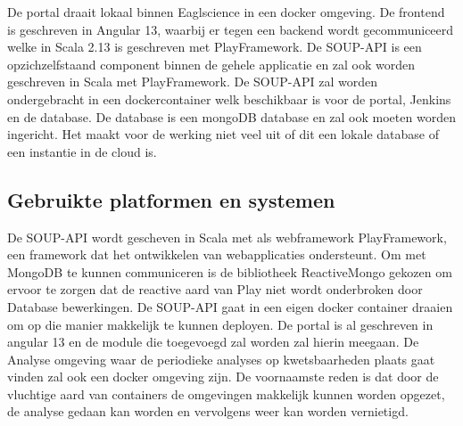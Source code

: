 De portal draait lokaal binnen Eaglscience in een docker omgeving. De frontend is geschreven in Angular 13, waarbij er tegen een backend wordt gecommuniceerd welke in Scala 2.13 is geschreven met PlayFramework. De SOUP-API is een opzichzelfstaand component binnen de gehele applicatie en zal ook worden geschreven in Scala met PlayFramework. De SOUP-API zal worden ondergebracht in een dockercontainer welk beschikbaar is voor de portal, Jenkins en de database. De database is een mongoDB database en zal ook moeten worden ingericht. Het maakt voor de werking niet veel uit of dit een lokale database of een instantie in de cloud is.

\subsection{Gebruikte platformen en systemen}
De SOUP-API wordt gescheven in Scala met als webframework PlayFramework, een framework dat het ontwikkelen van webapplicaties ondersteunt. Om met MongoDB te kunnen communiceren is de bibliotheek ReactiveMongo gekozen om ervoor te zorgen dat de reactive aard van Play niet wordt onderbroken door Database bewerkingen. De SOUP-API gaat in een eigen docker container draaien om op die manier makkelijk te kunnen deployen. De portal is al geschreven in angular 13 en de module die toegevoegd zal worden zal hierin meegaan.
De Analyse omgeving waar de periodieke analyses op kwetsbaarheden plaats gaat vinden zal ook  een docker omgeving zijn. De voornaamste reden is dat door de vluchtige aard van containers de omgevingen makkelijk kunnen worden opgezet, de analyse gedaan kan worden en vervolgens weer kan worden vernietigd.

